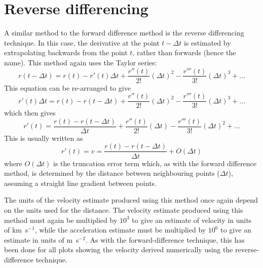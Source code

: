 \section{Reverse differencing}
\label{sect:reverse}

A similar method to the forward difference method is the reverse differencing technique. In this case, the derivative at the point $t - \Delta t$ is estimated by extrapolating backwards from the point $t$, rather than forwards (hence the name). This method again uses the Taylor series:
\begin{equation}
r(t - \Delta t) = r(t) - r'(t)\Delta t +  \frac{r''(t)}{2!}(\Delta t)^{2} - \frac{r'''(t)}{3!}(\Delta t)^{3}  + ...
\end{equation}
This equation can be re-arranged to give
\begin{equation}
r'(t)\Delta t = r(t ) - r(t - \Delta t) +  \frac{r''(t)}{2!}(\Delta t)^{2} - \frac{r'''(t)}{3!}(\Delta t)^{3}  + ...
\end{equation}
which then gives
\begin{equation}
r'(t) = \frac{r(t ) - r(t - \Delta t)}{\Delta t} +  \frac{r''(t)}{2!}(\Delta t) - \frac{r'''(t)}{3!}(\Delta t)^{2}  + ...
\end{equation}
This is usually written as
\begin{equation}
r'(t) = v = \frac{r(t ) - r(t - \Delta t)}{\Delta t} + O(\Delta t)
\end{equation}
where $O(\Delta t)$ is the truncation error term which, as with the forward difference method, is determined by the distance between neighbouring points ($\Delta t$), assuming a straight line gradient between points.

The units of the velocity estimate produced using this method once again depend on the units used for the distance. The velocity estimate produced using this method must again be multiplied by $10^{3}$ to give an estimate of velocity in units of km~s$^{-1}$, while the acceleration estimate must be multiplied by $10^{6}$ to give an estimate in units of m~s$^{-2}$. As with the forward-difference technique, this has been done for all plots showing the velocity derived numerically using the reverse-difference technique.

